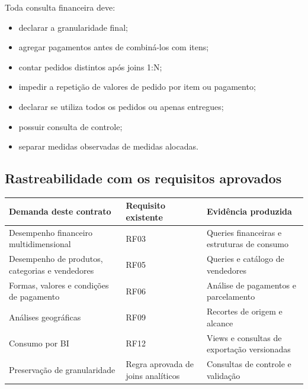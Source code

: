 \documentclass[12pt,a4paper]{article}
\newcounter{none}
\providecommand{\tightlist}{
  \setlength{\itemsep}{0pt}\setlength{\parskip}{0pt}
}
\begin{document}
Toda consulta financeira deve:

\begin{itemize}
\tightlist
\item
  declarar a granularidade final;
\item
  agregar pagamentos antes de combiná-los com itens;
\item
  contar pedidos distintos após joins 1:N;
\item
  impedir a repetição de valores de pedido por item ou pagamento;
\item
  declarar se utiliza todos os pedidos ou apenas entregues;
\item
  possuir consulta de controle;
\item
  separar medidas observadas de medidas alocadas.
\end{itemize}

\subsection{Rastreabilidade com os requisitos
aprovados}\label{docs__analytics__contrato_analitico.md__rastreabilidade-com-os-requisitos-aprovados}

{\def\LTcaptype{none} %
\begin{longtable}[]{@{}
  >{\raggedright\arraybackslash}p{}
  >{\raggedright\arraybackslash}p{}
  >{\raggedright\arraybackslash}p{}@{}}
\toprule\noalign{}
\rowcolor{AzulCorporativo}
\begin{minipage}[b]{\linewidth}\raggedright\color{white}\bfseries
Demanda deste contrato
\end{minipage} & \begin{minipage}[b]{\linewidth}\raggedright\color{white}\bfseries
Requisito existente
\end{minipage} & \begin{minipage}[b]{\linewidth}\raggedright\color{white}\bfseries
Evidência produzida
\end{minipage} \\
\midrule\noalign{}
\endhead
\bottomrule\noalign{}
\endlastfoot
Desempenho financeiro multidimensional & RF03 & Queries financeiras e
estruturas de consumo \\
Desempenho de produtos, categorias e vendedores & RF05 & Queries e
catálogo de vendedores \\
Formas, valores e condições de pagamento & RF06 & Análise de pagamentos
e parcelamento \\
Análises geográficas & RF09 & Recortes de origem e alcance \\
Consumo por BI & RF12 & Views e consultas de exportação versionadas \\
Preservação de granularidade & Regra aprovada de joins analíticos &
Consultas de controle e validação \\
\end{longtable}
}
\end{document}
